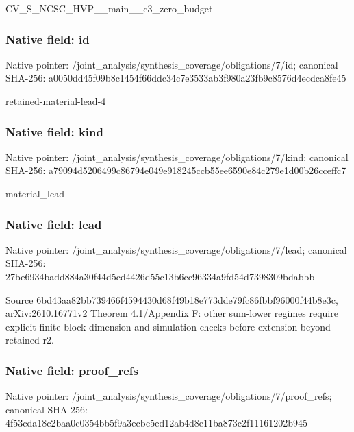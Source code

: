 \documentclass[10pt,a4paper]{article}
\begin{document}
\begingroup\raggedright\sloppy CV\_\allowbreak{}S\_\allowbreak{}NCSC\_\allowbreak{}HVP\_\allowbreak{}\_\allowbreak{}main\_\allowbreak{}\_\allowbreak{}c3\_\allowbreak{}zero\_\allowbreak{}budget\par\endgroup

\subsubsection{Native field: id}
Native pointer: /joint\_\allowbreak{}analysis/synthesis\_\allowbreak{}coverage/obligations/7/id; canonical SHA-256: a0050dd45f09b8c1454f66ddc34c7e3533ab3f980a23fb9c8576d4ecdca8fe45

\begingroup\raggedright\sloppy retained-material-lead-4\par\endgroup

\subsubsection{Native field: kind}
Native pointer: /joint\_\allowbreak{}analysis/synthesis\_\allowbreak{}coverage/obligations/7/kind; canonical SHA-256: a79094d5206499c86794e049e918245ccb55ee6590e84c279e1d00b26cceffc7

\begingroup\raggedright\sloppy material\_\allowbreak{}lead\par\endgroup

\subsubsection{Native field: lead}
Native pointer: /joint\_\allowbreak{}analysis/synthesis\_\allowbreak{}coverage/obligations/7/lead; canonical SHA-256: 27be6934badd884a30f44d5cd4426d55c13b6cc96334a9fd54d7398309bdabbb

\begingroup\raggedright\sloppy Source 6bd43aa82bb739466f4594430d68f49b18e773dde79fc86fbbf96000f44b8e3c,\allowbreak{} arXiv:\allowbreak{}2610.16771v2 Theorem 4.1/\allowbreak{}Appendix F:\allowbreak{} other sum-lower regimes require explicit finite-block-dimension and simulation checks before extension beyond retained r2.\par\endgroup

\subsubsection{Native field: proof\_\allowbreak{}refs}
Native pointer: /joint\_\allowbreak{}analysis/synthesis\_\allowbreak{}coverage/obligations/7/proof\_\allowbreak{}refs; canonical SHA-256: 4f53cda18c2baa0c0354bb5f9a3ecbe5ed12ab4d8e11ba873c2f11161202b945
\end{document}
